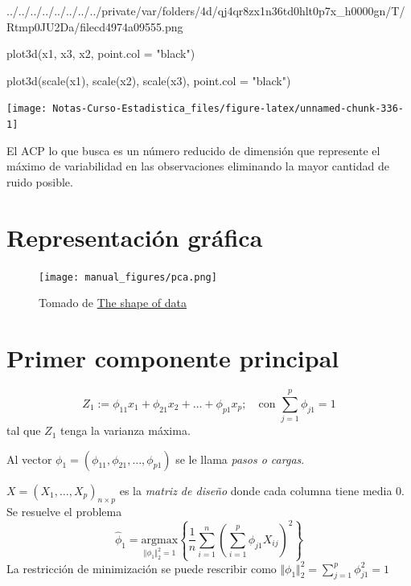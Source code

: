 \documentclass[
  12pt,
]{book}
\newenvironment{Shaded}{\begin{snugshade}}{\end{snugshade}}
\newcommand{\AttributeTok}[1]{\textcolor[rgb]{0.77,0.63,0.00}{#1}}
\newcommand{\FunctionTok}[1]{\textcolor[rgb]{0.00,0.00,0.00}{#1}}
\newcommand{\NormalTok}[1]{#1}
\newcommand{\StringTok}[1]{\textcolor[rgb]{0.31,0.60,0.02}{#1}}
\begin{document}
../../../../../../../../private/var/folders/4d/qj4qr8zx1n36td0hlt0p7x\_h0000gn/T/Rtmp0JU2Da/filecd4974a09555.png

\begin{Shaded}
\begin{Highlighting}[]
\FunctionTok{plot3d}\NormalTok{(x1, x3, x2, }\AttributeTok{point.col =} \StringTok{"black"}\NormalTok{)}

\FunctionTok{plot3d}\NormalTok{(}\FunctionTok{scale}\NormalTok{(x1), }\FunctionTok{scale}\NormalTok{(x2), }\FunctionTok{scale}\NormalTok{(x3), }\AttributeTok{point.col =} \StringTok{"black"}\NormalTok{)}
\end{Highlighting}
\end{Shaded}

\begin{center}\texttt{[image: Notas-Curso-Estadistica\_files/figure-latex/unnamed-chunk-336-1]} \end{center}

El ACP lo que busca es un número reducido de dimensión que represente el
máximo de variabilidad en las observaciones eliminando la mayor cantidad
de ruido posible.

\hypertarget{representaciuxf3n-gruxe1fica}{%
\section{Representación gráfica}\label{representaciuxf3n-gruxe1fica}}

\begin{figure}
\centering
\texttt{[image: manual\_figures/pca.png]}
\caption{Tomado de
\href{https://shapeofdata.wordpress.com/2013/04/09/principle-component-analysis/}{The
shape of data}}
\end{figure}

\hypertarget{primer-componente-principal}{%
\section{Primer componente
principal}\label{primer-componente-principal}}

\[ Z_1 := \phi_{11}x_1 +  \phi_{21}x_2 + \dots + \phi_{p1}x_p;\quad \text{con } \sum_{j=1}^{p}\phi_{j1} = 1\]
tal que \(Z_1\) tenga la varianza máxima.

Al vector \(\phi_1 = (\phi_{11}, \phi_{21},\dots,\phi_{p1})\) se le
llama \emph{pasos o cargas}.

\(X = (X_1,\dots,X_p)_{n\times p}\) es la \emph{matriz de diseño} donde
cada columna tiene media 0. Se resuelve el problema
\[\hat{\phi}_1=\underset{\Vert\phi_1\Vert_2^2=1}{\mathrm{argmax}} \left\lbrace\dfrac{1}{n}\sum_{i=1}^{n}\left(\sum_{i=1}^p \phi_{j1} X_{ij} \right)^2 \right\rbrace \]
La restricción de minimización se puede rescribir como
\(\Vert\phi_1\Vert_2^2= \sum_{j=1}^p \phi_{j1}^2 = 1\)
\end{document}
